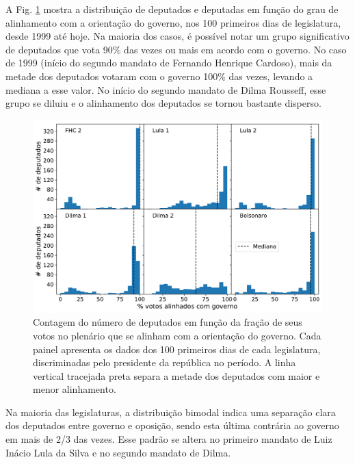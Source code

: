 \documentclass[12pt,a4paper]{article}
\begin{document}
A Fig. \ref{fig:apoio-governo-deputados} mostra a distribuição de deputados e deputadas em função do grau de
alinhamento com a orientação do governo, nos 100 primeiros dias de legislatura, desde 1999 até hoje.
Na maioria dos casos, é possível notar um grupo significativo de deputados que vota 90\% das vezes ou mais em acordo com o governo.
No caso de 1999 (início do segundo mandato de Fernando Henrique Cardoso), mais da metade dos deputados votaram
com o governo 100\% das vezes, levando a mediana a esse valor. No início do segundo mandato de Dilma Rousseff,
esse grupo se diluiu e o alinhamento dos deputados se tornou bastante disperso.

\begin{figure}[H]
\centering
\includegraphics[width=1.0\textwidth]{graficos/apoio_ao_governo_deputados_2019-05-09.pdf}
\caption{Contagem do número de deputados em função da fração de seus votos no plenário que se
  alinham com a orientação do governo. Cada painel apresenta os dados dos 100 primeiros dias de
  cada legislatura, discriminadas pelo presidente da república no período. A linha vertical tracejada preta
  separa a metade dos deputados com maior e menor alinhamento.}
\label{fig:apoio-governo-deputados}
\end{figure}

Na maioria das legislaturas, a distribuição bimodal indica uma separação clara dos deputados
entre governo e oposição, sendo esta última contrária ao governo em mais de 2/3 das vezes.
Esse padrão se altera no primeiro mandato de Luiz Inácio Lula da Silva e no segundo mandato de Dilma.
\end{document}

